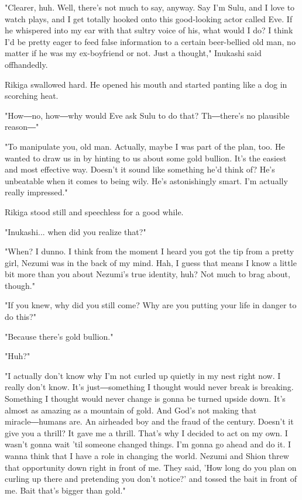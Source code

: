 "Clearer, huh. Well, there's not much to say, anyway. Say I'm Sulu, and
I love to watch plays, and I get totally hooked onto this good-looking
actor called Eve. If he whispered into my ear with that sultry voice of
his, what would I do? I think I'd be pretty eager to feed false
information to a certain beer-bellied old man, no matter if he was my
ex-boyfriend or not. Just a thought," Inukashi said offhandedly.

Rikiga swallowed hard. He opened his mouth and started panting like a
dog in scorching heat.

"How―no, how―why would Eve ask Sulu to do that? Th―there's no plausible
reason―"

"To manipulate you, old man. Actually, maybe I was part of the plan,
too. He wanted to draw us in by hinting to us about some gold bullion.
It's the easiest and most effective way. Doesn't it sound like something
he'd think of? He's unbeatable when it comes to being wily. He's
astonishingly smart. I'm actually really impressed."

Rikiga stood still and speechless for a good while.

"Inukashi... when did you realize that?"

"When? I dunno. I think from the moment I heard you got the tip from a
pretty girl, Nezumi was in the back of my mind. Hah, I guess that means
I know a little bit more than you about Nezumi's true identity, huh? Not
much to brag about, though."

"If you knew, why did you still come? Why are you putting your life in
danger to do this?"

"Because there's gold bullion."

"Huh?"

"I actually don't know why I'm not curled up quietly in my nest right
now. I really don't know. It's just―something I thought would never
break is breaking. Something I thought would never change is gonna be
turned upside down. It's almost as amazing as a mountain of gold. And
God's not making that miracle―humans are. An airheaded boy and the fraud
of the century. Doesn't it give you a thrill? It gave me a thrill.
That's why I decided to act on my own. I wasn't gonna wait 'til someone
changed things. I'm gonna go ahead and do it. I wanna think that I have
a role in changing the world. Nezumi and Shion threw that opportunity
down right in front of me. They said, 'How long do you plan on curling
up there and pretending you don't notice?' and tossed the bait in front
of me. Bait that's bigger than gold."

